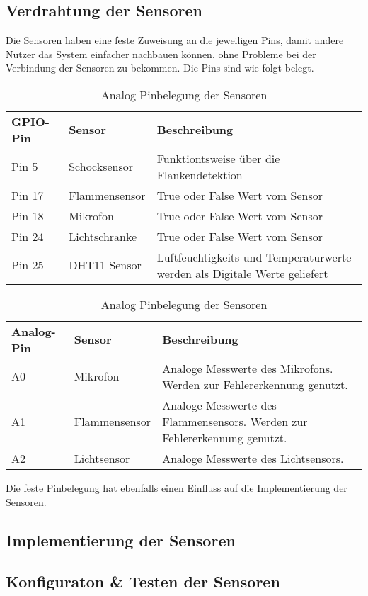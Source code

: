 \subsection{Verdrahtung der Sensoren}
Die Sensoren haben eine feste Zuweisung an die jeweiligen Pins, damit andere Nutzer das System einfacher nachbauen können, ohne Probleme bei der Verbindung der Sensoren zu bekommen. Die Pins sind wie folgt belegt.

\begin{table}[h]
	\caption{GPIO Pinbelegung der Sensoren}
	\label{tab:GPIO-Pinbelegung}
	\begin{tabular}{p{} p{} p{}}
		\textbf{GPIO-Pin}	& \textbf{Sensor} & \textbf{Beschreibung} \\
		Pin 5 		& Schocksensor 	& Funktiontsweise über die Flankendetektion\\	
		Pin 17		& Flammensensor	& True oder False Wert vom Sensor\\
		Pin 18		& Mikrofon		& True oder False Wert vom Sensor\\
		Pin 24		& Lichtschranke	& True oder False Wert vom Sensor\\
		Pin 25		& DHT11 Sensor	& Luftfeuchtigkeits und Temperaturwerte werden als Digitale Werte geliefert
	\end{tabular}
	\caption{Analog Pinbelegung der Sensoren}
	\begin{tabular}{p{} p{} p{}}
		\textbf{Analog-Pin}	& \textbf{Sensor} & \textbf{Beschreibung} \\
		A0	& Mikrofon 		& Analoge Messwerte des Mikrofons. Werden zur Fehlererkennung genutzt. \\
		A1	& Flammensensor	& Analoge Messwerte des Flammensensors. Werden zur Fehlererkennung genutzt.\\
		A2	& Lichtsensor	& Analoge Messwerte des Lichtsensors.
	\end{tabular}
\end{table}

Die feste Pinbelegung hat ebenfalls einen Einfluss auf die Implementierung der Sensoren.
\subsection{Implementierung der Sensoren}
\subsection{Konfiguraton \& Testen der Sensoren}
